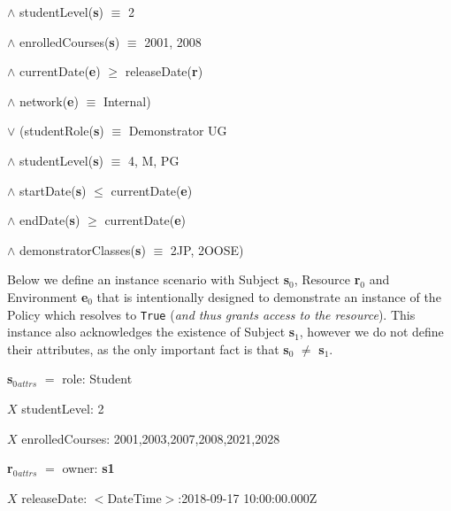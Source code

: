 \documentclass[a4paper,11pt]{article}
\begin{document}
\hspace{2.8cm}$\wedge{}$ studentLevel(\textbf{s}) $\equiv$ 2\par
\hspace{2.8cm}$\wedge{}$ enrolledCourses(\textbf{s}) $\equiv$ 2001, 2008\par
\hspace{2.8cm}$\wedge{}$ currentDate(\textbf{e}) $\geq$ releaseDate(\textbf{r})\par
\hspace{2.8cm}$\wedge{}$ network(\textbf{e}) $\equiv$ Internal)\par
\hspace{2.3cm}$\vee{}$ (studentRole(\textbf{s}) $\equiv$ Demonstrator UG\par
\hspace{2.8cm}$\wedge{}$ studentLevel(\textbf{s}) $\equiv$ 4, M, PG\par
\hspace{2.8cm}$\wedge{}$ startDate(\textbf{s}) $\leq$ currentDate(\textbf{e})\par
\hspace{2.8cm}$\wedge{}$ endDate(\textbf{s}) $\geq$ currentDate(\textbf{e})\par
\hspace{2.8cm}$\wedge{}$ demonstratorClasses(\textbf{s}) $\equiv$ 2JP, 2OOSE)
\par\par

Below we define an instance scenario with Subject \textbf{s$_{0}$}, Resource \textbf{r$_{0}$} and Environment \textbf{e$_{0}$} that is intentionally designed to demonstrate an instance of the Policy which resolves to \texttt{True} (\textit{and thus grants access to the resource}). This instance also acknowledges the existence of Subject \textbf{s$_{1}$}, however we do not define their attributes, as the only important fact is that \textbf{s$_{0}$} $\neq$ \textbf{s$_{1}$}.\\\par

\textbf{s$_{0}$}$_{attrs}$ $=$ role: Student\par
\hspace{1.17cm}$X$ studentLevel: 2\par
\hspace{1.17cm}$X$ enrolledCourses: 2001,2003,2007,2008,2021,2028\\\par

\textbf{r$_{0}$}$_{attrs}$ $=$ owner: \textbf{s1}\par
\hspace{1.17cm}$X$ releaseDate: $<$DateTime$>$:2018-09-17 10:00:00.000Z\\\par
\end{document}
